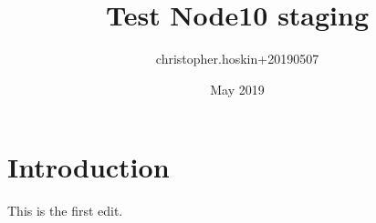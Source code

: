 \documentclass{article}
\title{Test Node10 staging}
\author{christopher.hoskin+20190507 }
\date{May 2019}
\begin{document}
\maketitle

\section{Introduction}

This is the first edit.

\cite{}
\end{document}
